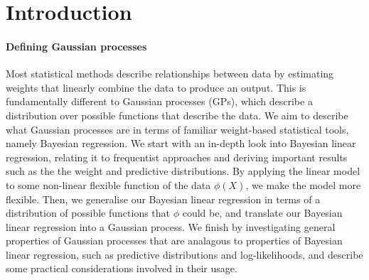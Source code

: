 \section{Introduction}

\paragraph{Defining Gaussian processes}
Most statistical methods describe relationships between data by estimating weights that linearly combine the data to produce an output. This is fundamentally different to Gaussian processes (GPs), which describe a distribution over possible functions that describe the data. We aim to describe what Gaussian processes are in terms of familiar weight-based statistical tools, namely Bayesian regression. We start with an in-depth look into Bayesian linear regression, relating it to frequentist approaches and deriving important results such as the the weight and predictive distributions. By applying the linear model to some non-linear flexible function of the data $\phi(X)$, we make the model more flexible. Then, we generalise our Bayesian linear regression in terms of a distribution of possible functions that $\phi$ could be, and translate our Bayesian linear regression into a Gaussian process. We finish by investigating general properties of Gaussian processes that are analagous to properties of Bayesian linear regression, such as predictive distributions and log-likelihoods, and describe some practical considerations involved in their usage.


